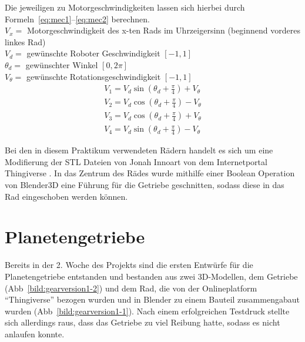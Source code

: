 Die jeweiligen zu Motorgeschwindigkeiten lassen sich hierbei durch Formeln~\ref{eq:mec1}--\ref{eq:mec2} berechnen.\\

$V_x =$ Motorgeschwindigkeit des x-ten Rads im Uhrzeigersinn (beginnend vorderes linkes Rad)\\
$V_d =$ gewünschte Roboter Geschwindigkeit $[-1, 1]$\\
$\theta_d =$ gewünschter Winkel $[0, 2\pi]$\\
$V_\theta =$ gewünschte Rotationsgeschwindigkeit $[-1, 1]$\\


\begin{align}
	V_1 = V_d\sin{(\theta_d+\frac{\pi}{4})} + V_\theta \label{eq:mec1}\\
	V_2 = V_d\cos{(\theta_d+\frac{\pi}{4})} - V_\theta\\
	V_3 = V_d\cos{(\theta_d+\frac{\pi}{4})} + V_\theta\\
	V_4 = V_d\sin{(\theta_d+\frac{\pi}{4})} - V_\theta \label{eq:mec2}
\end{align} 

Bei den in diesem Praktikum verwendeten Rädern handelt es sich um eine Modifierung der STL Dateien von Jonah Innoart von dem Internetportal Thingiverse \cite{link:mecanum44}. 
In das Zentrum des Rädes wurde mithilfe einer Boolean Operation von Blender3D eine Führung für die Getriebe geschnitten, sodass diese in das Rad eingeschoben werden können.

\section{Planetengetriebe}

Bereits in der 2. Woche des Projekts sind die ersten Entwürfe für die Planetengetriebe entstanden und bestanden aus zwei 3D-Modellen, dem Getriebe (Abb~\ref{bild:gearversion1-2}) und dem Rad, die von der Onlineplatform ``Thingiverse'' bezogen wurden
und in Blender zu einem Bauteil zusammengabaut wurden (Abb~\ref{bild:gearversion1-1}). Nach einem erfolgreichen Testdruck stellte sich allerdings raus, dass das Getriebe zu viel Reibung hatte, sodass es nicht anlaufen konnte.


